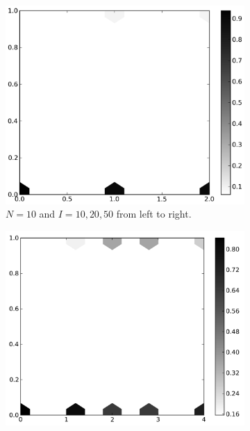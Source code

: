 \documentclass{amsart}
\begin{document}
\begin{figure}[h!tbp]  
  \begin{subfigure}{.31\linewidth}
    \centering
    \includegraphics[width=\linewidth]{pop10iter.png}
    \caption{$N=10$ and $I = 10, 20, 50$ from left to right. \\}
    \label{fig:pop10iter}
  \end{subfigure}
  \hspace{.01\linewidth}
  \begin{subfigure}{.31\linewidth}  
    \centering
    \includegraphics[width=\linewidth]{pop20iter.png}

\end{subfigure}
\end{figure}
\end{document}

